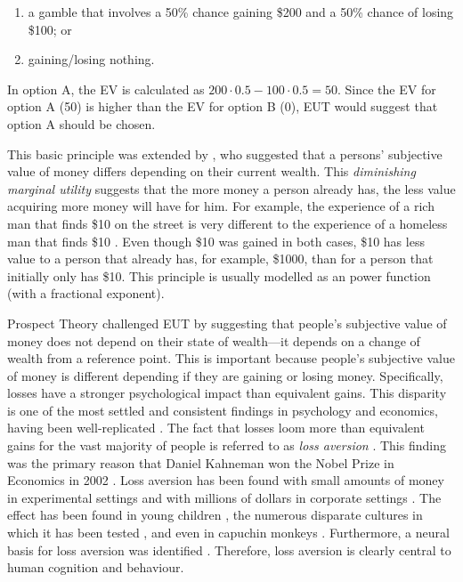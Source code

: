 \documentclass[a4paper, nobind, dvipsnames]{templates/ociamthesis}
\providecommand{\tightlist}{%
  \setlength{\itemsep}{0pt}\setlength{\parskip}{0pt}}
\theoremstyle{definition}
\theoremstyle{definition}
\theoremstyle{definition}
\theoremstyle{definition}
\theoremstyle{remark}
\begin{document}
\begin{enumerate}
\def\labelenumi{\Alph{enumi})}
\tightlist
\item
  a gamble that involves a 50\% chance gaining \$200 and a 50\% chance of losing
  \$100; or
\item
  gaining/losing nothing.
\end{enumerate}

In option A, the EV is calculated as \(200 \cdot 0.5 - 100 \cdot 0.5 = 50\). Since
the EV for option A (50) is higher than the EV for option B (0), EUT would
suggest that option A should be chosen.

This basic principle was extended by \textcite{bernoulli1954}, who suggested that a
persons' subjective value of money differs depending on their current wealth.
This \emph{diminishing marginal utility} suggests that the more money a person
already has, the less value acquiring more money will have for him. For example,
the experience of a rich man that finds \$10 on the street is very different to
the experience of a homeless man that finds \$10 \autocite{bradley2013}. Even though \$10
was gained in both cases, \$10 has less value to a person that already has, for
example, \$1000, than for a person that initially only has \$10. This principle is
usually modelled as an power function (with a fractional exponent).

Prospect Theory \autocite{kahneman1979,tversky1992} challenged EUT by suggesting that
people's subjective value of money does not depend on their state of wealth---it
depends on a change of wealth from a reference point. This is important because
people's subjective value of money is different depending if they are gaining or
losing money. Specifically, losses have a stronger psychological impact than
equivalent gains. This disparity is one of the most settled and consistent
findings in psychology and economics, having been well-replicated \autocite[e.g,][]{ruggeri2020}. The fact that losses loom more than equivalent gains for the vast
majority of people is referred to as \emph{loss aversion} \autocite{kahneman1979}. This
finding was the primary reason that Daniel Kahneman won the Nobel Prize in
Economics in 2002 \autocite{kahneman2003}. Loss aversion has been found with small
amounts of money in experimental settings \autocite{kahneman1979,tversky1992} and with
millions of dollars in corporate settings \autocite{koller2012,swalm1966}. The effect
has been found in young children \autocite{harbaugh2001}, the numerous disparate
cultures in which it has been tested \autocite{weber1998}, and even in capuchin monkeys
\autocite{chen2006a}. Furthermore, a neural basis for loss aversion was identified
\autocite{tom2007}. Therefore, loss aversion is clearly central to human cognition and
behaviour.
\end{document}
